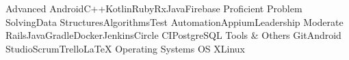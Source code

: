 \begin{cvskills}
  \cvskill
    {Advanced}
    {Android{\dotsep}C++{\dotsep}Kotlin{\dotsep}Ruby{\dotsep}RxJava{\dotsep}Firebase}
  \cvskill
    {Proficient}
    {Problem Solving{\dotsep}Data Structures{\dotsep}Algorithms{\dotsep}Test Automation{\dotsep}Appium{\dotsep}Leadership}
  \cvskill
    {Moderate}
    {Rails{\dotsep}Java{\dotsep}Gradle{\dotsep}Docker{\dotsep}Jenkins{\dotsep}Circle CI{\dotsep}PostgreSQL}
  \cvskill
    {Tools \& Others}
    {Git{\dotsep}Android Studio{\dotsep}Scrum{\dotsep}Trello{\dotsep}\LaTeX}
  \cvskill
    {Operating Systems}
    {OS X{\dotsep}Linux}
\end{cvskills}
